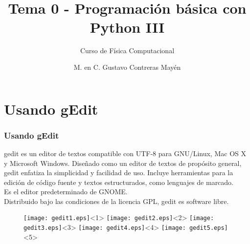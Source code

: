 

\title{Tema 0 - Programaci\'{o}n b\'{a}sica con Python III}
\subtitle{Curso de F\'{i}sica Computacional}
\author[]{M. en C. Gustavo Contreras May\'{e}n}
\date{}


\maketitle
\fontsize{14}{14}\selectfont
{}
\section{Usando gEdit}
\begin{frame}
\frametitle{Usando gEdit}
gedit es un editor de textos compatible con UTF-8 para GNU/Linux, Mac OS X y Microsoft Windows. Diseñado como un editor de textos de prop\'{o}sito general, gedit enfatiza la simplicidad y  facilidad de uso. Incluye herramientas para la edici\'{o}n de c\'{o}digo fuente y textos estructurados, como lenguajes de marcado.
\\
\medskip
Es el editor predeterminado de GNOME.
\\
\medskip
Distribuido bajo las condiciones de la licencia GPL, gedit es software libre.
\end{frame}
\begin{frame}[fragile]
\begin{figure}
	\centering
	\texttt{[image: gedit1.eps]}<1> 
	\texttt{[image: gedit2.eps]}<2>
	\texttt{[image: gedit3.eps]}<3>
	\texttt{[image: gedit4.eps]}<4>
	\texttt{[image: gedit5.eps]}<5>
\end{figure}
\end{frame}
